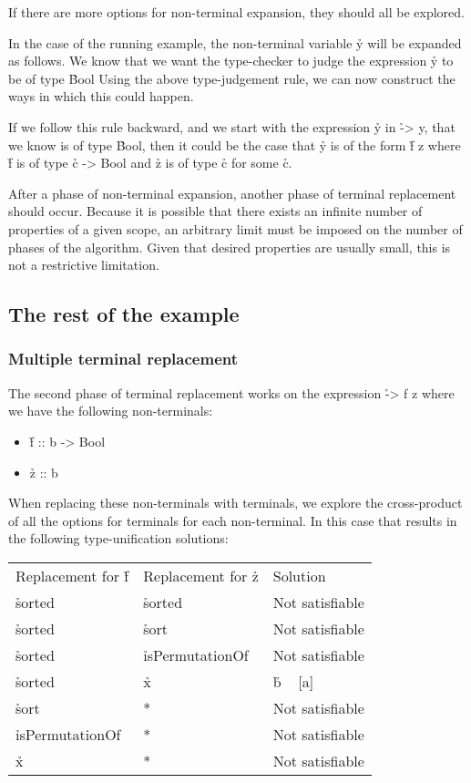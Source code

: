 \documentclass[a4paper, 11pt]{article}
\begin{document}
If there are more options for non-terminal expansion, they should all be explored.

In the case of the running example, the non-terminal variable \h{y} will be expanded as follows.
We know that we want the type-checker to judge the expression \h{y} to be of type \h{Bool}
Using the above type-judgement rule, we can now construct the ways in which this could happen.

If we follow this rule backward, and we start with the expression \h{y} in \h{\x -> y}, that we know is of type \h{Bool}, then it could be the case that \h{y} is of the form \h{f z} where \h{f} is of type \h{c -> Bool} and \h{z} is of type \h{c} for some \h{c}.

After a phase of non-terminal expansion, another phase of terminal replacement should occur.
Because it is possible that there exists an infinite number of properties of a given scope, an arbitrary limit must be imposed on the number of phases of the algorithm.
Given that desired properties are usually small, this is not a restrictive limitation.

\subsection{The rest of the example}
\subsubsection{Multiple terminal replacement}
The second phase of terminal replacement works on the expression \h{\x -> f z} where we have the following non-terminals:

\begin{itemize}
  \item \h{f :: b -> Bool}
  \item \h{z :: b}
\end{itemize}

When replacing these non-terminals with terminals, we explore the cross-product of all the options for terminals for each non-terminal.
In this case that results in the following type-unification solutions:

\begin{tabular}{lll}
  Replacement for \h{f} & Replacement for \h{z} & Solution \\
  \h{sorted}            & \h{sorted}            &  Not satisfiable \\
  \h{sorted}            & \h{sort}              &  Not satisfiable \\
  \h{sorted}            & \h{isPermutationOf}   &  Not satisfiable \\
  \h{sorted}            & \h{x}                 &  \h{b ~ [a]}     \\
  \h{sort}              & *                     &  Not satisfiable \\
  \h{isPermutationOf}   & *                     &  Not satisfiable \\
  \h{x}                 & *                     &  Not satisfiable \\
\end{tabular}
\end{document}
